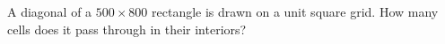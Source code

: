 A diagonal of a $500\times800$ rectangle is drawn on a unit square grid. How many cells does it pass through in their interiors?
